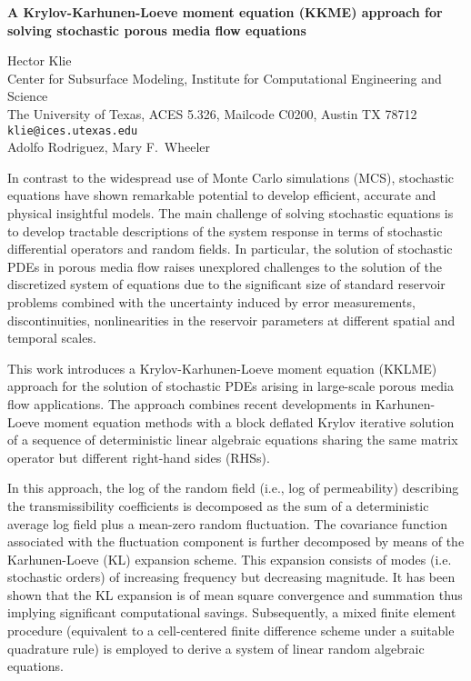 \documentclass{report}
\begin{document}

\begin{center}
{\large
{\bf A Krylov-Karhunen-Loeve moment equation (KKME) approach for \\
	solving stochastic porous media flow equations}}

	Hector Klie \\
	Center for Subsurface Modeling, Institute for Computational
	Engineering and Science \\
	The University of Texas, ACES 5.326, Mailcode C0200, Austin TX 78712 \\
	{\tt klie@ices.utexas.edu} \\
	Adolfo Rodriguez, Mary F.~Wheeler
\end{center}
In contrast to the widespread use of Monte Carlo simulations
(MCS), stochastic equations have shown remarkable potential
to develop efficient, accurate and physical insightful
models. The main challenge of solving stochastic equations
is to develop tractable descriptions of the system response
in terms of stochastic differential operators and random
fields. In particular, the solution of stochastic PDEs in
porous media flow raises unexplored challenges to the
solution of the discretized system of equations due to the
significant size of standard reservoir problems combined
with the uncertainty induced by error measurements,
discontinuities, nonlinearities in the reservoir parameters
at different spatial and temporal scales.

This work
introduces a Krylov-Karhunen-Loeve moment equation (KKLME)
approach for the solution of stochastic PDEs arising in
large-scale porous media flow applications. The approach
combines recent developments in Karhunen-Loeve moment
equation methods with a block deflated Krylov iterative
solution of a sequence of deterministic linear algebraic
equations sharing the same matrix operator but different
right-hand sides (RHSs).

In this approach, the log of the
random field (i.e., log of permeability) describing the
transmissibility coefficients is decomposed as the sum of a
deterministic average log field plus a mean-zero random
fluctuation. The covariance function associated with the
fluctuation component is further decomposed by means of the
Karhunen-Loeve (KL) expansion scheme. This expansion
consists of modes (i.e. stochastic orders) of increasing
frequency but decreasing magnitude. It has been shown that
the KL expansion is of mean square convergence and summation
thus implying significant computational savings.
Subsequently, a mixed finite element procedure (equivalent
to a cell-centered finite difference scheme under a suitable
quadrature rule) is employed to derive a system of linear
random algebraic equations.
\end{document}
